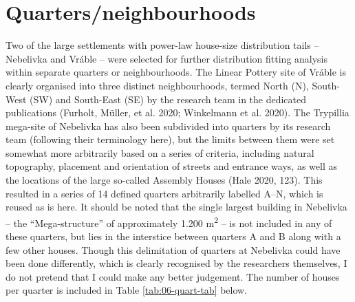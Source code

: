 \documentclass[
  12pt,
  a4paper, twoside]{book}
\begin{document}
\FloatBarrier

\hypertarget{quartersneighbourhoods}{%
\section{Quarters/neighbourhoods}\label{quartersneighbourhoods}}

Two of the large settlements with power-law house-size distribution tails -- Nebelivka and Vráble -- were selected for further distribution fitting analysis within separate quarters or neighbourhoods. The Linear Pottery site of Vráble is clearly organised into three distinct neighbourhoods, termed North (N), South-West (SW) and South-East (SE) by the research team in the dedicated publications (Furholt, Müller, et al. 2020; Winkelmann et al. 2020). The Trypillia mega-site of Nebelivka has also been subdivided into quarters by its research team (following their terminology here), but the limits between them were set somewhat more arbitrarily based on a series of criteria, including natural topography, placement and orientation of streets and entrance ways, as well as the locations of the large so-called Assembly Houses (Hale 2020, 123). This resulted in a series of 14 defined quarters arbitrarily labelled A--N, which is reused as is here. It should be noted that the single largest building in Nebelivka -- the ``Mega-structure'' of approximately 1.200 m\textsuperscript{2} -- is not included in any of these quarters, but lies in the interstice between quarters A and B along with a few other houses. Though this delimitation of quarters at Nebelivka could have been done differently, which is clearly recognised by the researchers themselves, I do not pretend that I could make any better judgement. The number of houses per quarter is included in Table \ref{tab:06-quart-tab} below.
\end{document}
